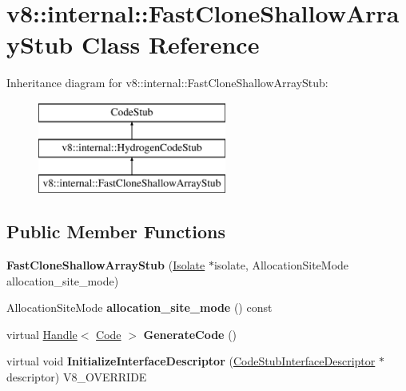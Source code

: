 \hypertarget{classv8_1_1internal_1_1_fast_clone_shallow_array_stub}{}\section{v8\+:\+:internal\+:\+:Fast\+Clone\+Shallow\+Array\+Stub Class Reference}
\label{classv8_1_1internal_1_1_fast_clone_shallow_array_stub}
Inheritance diagram for v8\+:\+:internal\+:\+:Fast\+Clone\+Shallow\+Array\+Stub\+:\begin{figure}[H]
\begin{center}
\leavevmode
\includegraphics[height=3.000000cm]{classv8_1_1internal_1_1_fast_clone_shallow_array_stub}
\end{center}
\end{figure}
\subsection*{Public Member Functions}
\begin{DoxyCompactItemize}
\item 
\hypertarget{classv8_1_1internal_1_1_fast_clone_shallow_array_stub_a75d87f7d859717e1cab296cf7cc80683}{}{\bfseries Fast\+Clone\+Shallow\+Array\+Stub} (\hyperlink{classv8_1_1internal_1_1_isolate}{Isolate} $\ast$isolate, Allocation\+Site\+Mode allocation\+\_\+site\+\_\+mode)\label{classv8_1_1internal_1_1_fast_clone_shallow_array_stub_a75d87f7d859717e1cab296cf7cc80683}

\item 
\hypertarget{classv8_1_1internal_1_1_fast_clone_shallow_array_stub_abc7195147d757a7b56f21ef191ea9c1f}{}Allocation\+Site\+Mode {\bfseries allocation\+\_\+site\+\_\+mode} () const \label{classv8_1_1internal_1_1_fast_clone_shallow_array_stub_abc7195147d757a7b56f21ef191ea9c1f}

\item 
\hypertarget{classv8_1_1internal_1_1_fast_clone_shallow_array_stub_acdb59bcf37025a6a03209b66558945a6}{}virtual \hyperlink{classv8_1_1internal_1_1_handle}{Handle}$<$ \hyperlink{classv8_1_1internal_1_1_code}{Code} $>$ {\bfseries Generate\+Code} ()\label{classv8_1_1internal_1_1_fast_clone_shallow_array_stub_acdb59bcf37025a6a03209b66558945a6}

\item 
\hypertarget{classv8_1_1internal_1_1_fast_clone_shallow_array_stub_a80695f8d403a659d44122883d4406d19}{}virtual void {\bfseries Initialize\+Interface\+Descriptor} (\hyperlink{classv8_1_1internal_1_1_code_stub_interface_descriptor}{Code\+Stub\+Interface\+Descriptor} $\ast$descriptor) V8\+\_\+\+O\+V\+E\+R\+R\+I\+D\+E\label{classv8_1_1internal_1_1_fast_clone_shallow_array_stub_a80695f8d403a659d44122883d4406d19}

\end{DoxyCompactItemize}
